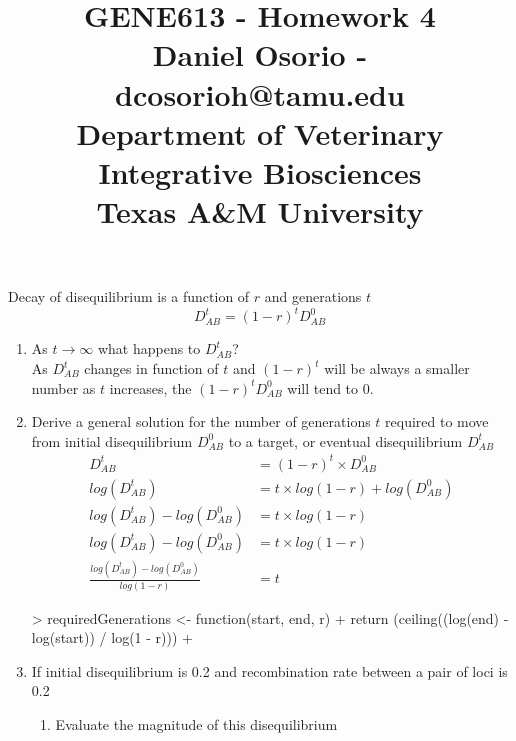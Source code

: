 \documentclass[12pt,a4paper]{paper}
\begin{document}
\title{GENE613 - Homework 4\\\small{Daniel Osorio - dcosorioh@tamu.edu\\Department of Veterinary Integrative Biosciences\\Texas A\&M University}}
\maketitle

Decay of disequilibrium is a function of $r$ and generations $t$
\begin{equation*}
D^{t}_{AB} = \left(1-r\right)^{t}D_{AB}^{0}
\end{equation*}
\begin{enumerate}
\item As $t \rightarrow \infty$ what happens to $D^{t}_{AB}$?\\
As $D^{t}_{AB}$ changes in function of  $t$ and $(1-r)^{t}$ will be always a smaller number as $t$ increases, the $\left(1-r\right)^{t}D_{AB}^{0}$ will tend to 0.
\item Derive a general solution for the number of generations $t$ required to move from initial disequilibrium $D_{AB}^{0}$ to a target, or eventual disequilibrium $D_{AB}^{t}$
\begin{equation}
\begin{split}
D^{t}_{AB} &= \left(1-r\right)^{t} \times D_{AB}^{0}\\
log\left(D^{t}_{AB}\right) &= t \times log\left(1-r\right) + log\left(D_{AB}^{0}\right)\\
log\left(D^{t}_{AB}\right) - log\left(D_{AB}^{0}\right) &= t \times log\left(1-r\right)\\
log\left(D^{t}_{AB}\right) - log\left(D_{AB}^{0}\right) &= t \times log\left(1-r\right)\\
\frac{log\left(D^{t}_{AB}\right) - log\left(D_{AB}^{0}\right)}{log\left(1-r\right)} &= t
\end{split}
\end{equation}
\begin{Schunk}
\begin{Sinput}
> requiredGenerations <- function(start, end, r) {
+   return (ceiling((log(end) - log(start)) / log(1 - r)))
+ }
\end{Sinput}
\end{Schunk}
\item If initial disequilibrium is 0.2 and recombination rate between a pair of loci is 0.2
\begin{enumerate}
\item Evaluate the magnitude of this disequilibrium\\

\end{enumerate}
\end{enumerate}
\end{document}
